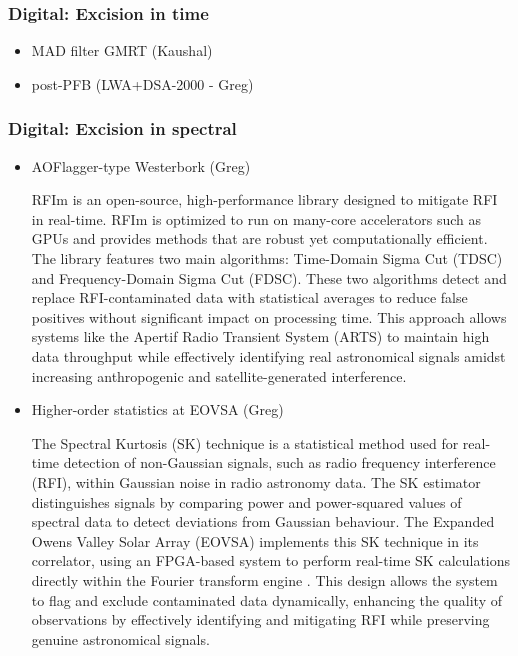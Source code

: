 \subsubsection{Digital: Excision in time}

\begin{itemize}
\item MAD filter GMRT (Kaushal)
\item post-PFB (LWA+DSA-2000 - Greg)
\end{itemize}

\subsubsection{Digital: Excision in spectral}
\begin{itemize}
\item AOFlagger-type Westerbork (Greg)

 RFIm \cite{sclocco2019real} is an open-source, high-performance library designed to mitigate RFI in real-time. RFIm is optimized to run on many-core accelerators such as GPUs and provides methods that are robust yet computationally efficient. The library features two main algorithms: Time-Domain Sigma Cut (TDSC) and Frequency-Domain Sigma Cut (FDSC). These two algorithms detect and replace RFI-contaminated data with statistical averages to reduce false positives without significant impact on processing time. This approach allows systems like the Apertif Radio Transient System (ARTS) to maintain high data throughput while effectively identifying real astronomical signals amidst increasing anthropogenic and satellite-generated interference.
 
\item Higher-order statistics at EOVSA (Greg)

The Spectral Kurtosis (SK) technique is a statistical method used for real-time detection of non-Gaussian signals, such as radio frequency interference (RFI), within Gaussian noise in radio astronomy data. The SK estimator distinguishes signals by comparing power and power-squared values of spectral data to detect deviations from Gaussian behaviour. The Expanded Owens Valley Solar Array (EOVSA) implements this SK technique in its correlator, using an FPGA-based system to perform real-time SK calculations directly within the Fourier transform engine \cite{}. This design allows the system to flag and exclude contaminated data dynamically, enhancing the quality of observations by effectively identifying and mitigating RFI while preserving genuine astronomical signals.


\end{itemize}
